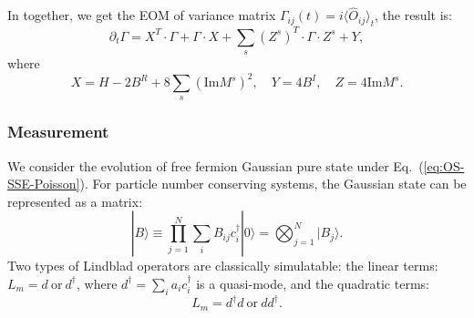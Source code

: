 \documentclass[aps,prb,superscriptaddress,nofootinbib]{revtex4}
\begin{document}
In together, we get the EOM of variance matrix $\Gamma_{ij}(t)=i\langle\hat O_{ij}\rangle_t$, the result is:
\begin{equation}
	\partial_t \Gamma = X^T\cdot\Gamma + \Gamma \cdot X + \sum_s (Z^s)^T \cdot \Gamma\cdot Z^s + Y,
\end{equation}
where
\begin{equation}
	X = H - 2B^R + 8 \sum_s (\mathrm{Im} M^s)^2, \quad
	Y = 4B^I, \quad 
	Z = 4 \mathrm{Im} M^s.
\end{equation}


\subsubsection{Measurement}
We consider the evolution of free fermion Gaussian pure state under Eq.~(\ref{eq:OS-SSE-Poisson}).
For particle number conserving systems, the Gaussian state can be represented as a matrix: $$|B\rangle \equiv \prod_{j=1}^N \sum_i B_{ij} c_{i}^\dagger |0\rangle = \bigotimes_{j=1}^N |B_j\rangle.$$
Two types of Lindblad operators are classically simulatable: the linear terms: $L_m = d \ \text{or}\ d^\dagger$, where $d^\dagger = \sum_i a_{i} c_i^\dagger$ is a quasi-mode, and the quadratic terms:
\begin{equation}
	L_m = d^\dagger d \ \text{or}\ d d^\dagger.
\end{equation}
\end{document}
